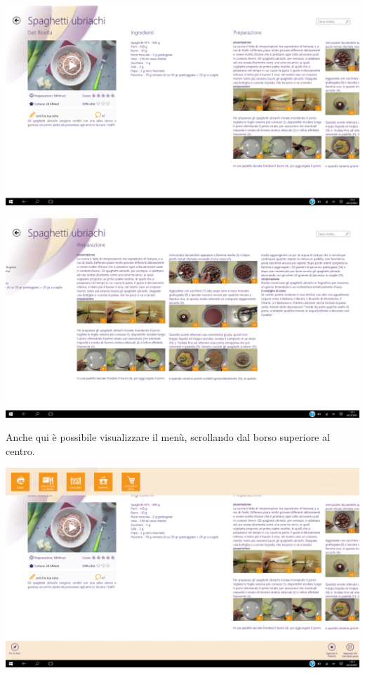 \begin{center}
\includegraphics[scale=0.275] {img/Giallozafferano/ricetta.png}  
\end{center}

\begin{center}
\includegraphics[scale=0.275] {img/Giallozafferano/ricetta_2.png}  
\end{center}

Anche qui è possibile visualizzare il menù, scrollando dal borso superiore al centro.

\begin{center}
\includegraphics[scale=0.275] {img/Giallozafferano/ricetta_menu.png}  
\end{center}

